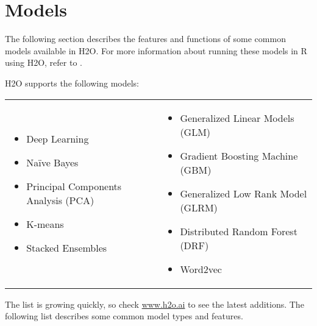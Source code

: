 {{\newpage
\section{Models}

The following section describes the features and functions of some common models available in H2O.  For more information about running these models in R using H2O, refer to {\textbf{}}.


\begin{minipage}{\textwidth}
H2O supports the following models:


\begin{frame}%

\begin{tabular}{p{5.0cm}p{6.0cm}}

\begin{itemize}
  \item Deep Learning
  \item Na\"{i}ve Bayes
  \item Principal Components Analysis (PCA)
  \item K-means
  \item Stacked Ensembles
\end{itemize} &

\begin{itemize}
  \item Generalized Linear Models (GLM) 
  \item Gradient Boosting Machine (GBM)
  \item Generalized Low Rank Model (GLRM)
  \item Distributed Random Forest (DRF)
  \item Word2vec
\end{itemize}

\end{tabular}

\end{frame}
\end{minipage}

The list is growing quickly, so check \url{www.h2o.ai} to see the latest additions. The following list describes some common model types and features.

}}
